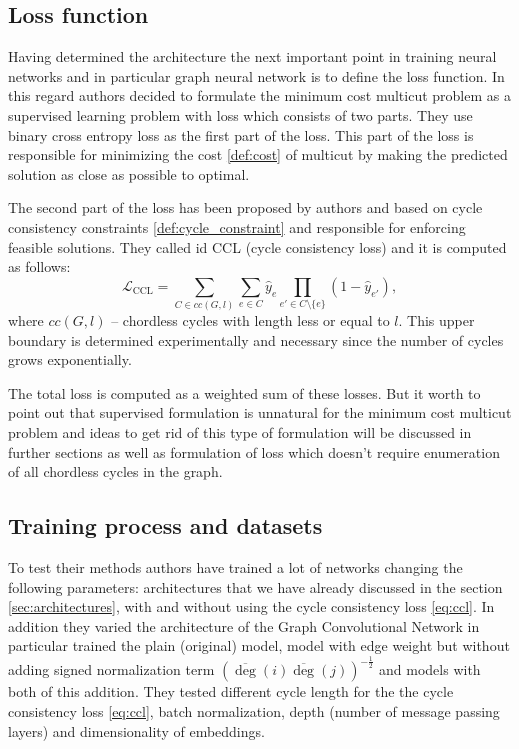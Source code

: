 \documentclass[10pt, twocolumn, a4paper]{article}
\theoremstyle{definition}
\begin{document}
\subsection{Loss function}
Having determined the architecture the next important point in training neural networks and
in particular graph neural network is to define the loss function. In this regard authors decided
to formulate the minimum cost multicut problem as a supervised learning problem with loss which consists of two parts.
They use binary cross entropy loss as the first part of the loss. This part of the loss is responsible for
minimizing the cost \eqref{def:cost} of multicut by making the predicted solution as
close as possible to optimal.

The second part of the loss has been proposed by authors and based on cycle consistency constraints \eqref{def:cycle_constraint}
and responsible for enforcing feasible solutions. They called id CCL (cycle consistency loss) and it is computed as follows:
\begin{equation} \label{eq:ccl}
    \mathcal{L}_{\text{CCL}} = \sum\limits_{C \in cc(G, l)} \sum\limits_{e \in C} \hat{y}_e
    \prod\limits_{e' \in C \setminus \{e\}} (1 - \hat{y}_{e'}),
\end{equation}
where $cc(G, l)$ -- chordless cycles with length less or equal to $l$. This upper boundary is determined
experimentally and necessary since the number of cycles grows exponentially.

The total loss is computed as a weighted sum of these losses. But it worth to point out that supervised
formulation is unnatural for the minimum cost multicut problem and ideas to get rid of this type of
formulation will be discussed in further sections as well as formulation of loss which doesn't require
enumeration of all chordless cycles in the graph.

\subsection{Training process and datasets}
To test their methods authors have trained a lot of networks changing the following parameters:
architectures that we have already discussed in the section \ref{sec:architectures},
with and without using the cycle consistency loss \eqref{eq:ccl}. In addition they varied the architecture
of the Graph Convolutional Network in particular trained the plain (original) model, model
with edge weight but without adding signed normalization term $\left( \overline{\deg}(i) \overline{\deg}(j) \right)^{-\frac{1}{2}}$
and models with both of this addition. They tested different cycle length for the the cycle consistency loss \eqref{eq:ccl},
batch normalization, depth (number of message passing layers) and dimensionality of embeddings.
\end{document}
